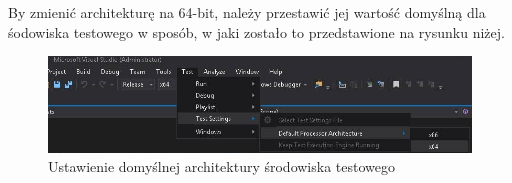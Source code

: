 By zmienić architekturę na 64-bit, należy przestawić jej wartość domyślną dla śodowiska testowego w sposób, w jaki zostało to przedstawione na rysunku niżej.

\begin{figure}[H]
	\includegraphics[width=15cm]{img/UnitTests_x64_architecture.png}
	\caption{Ustawienie domyślnej architektury środowiska testowego}
\end{figure}
